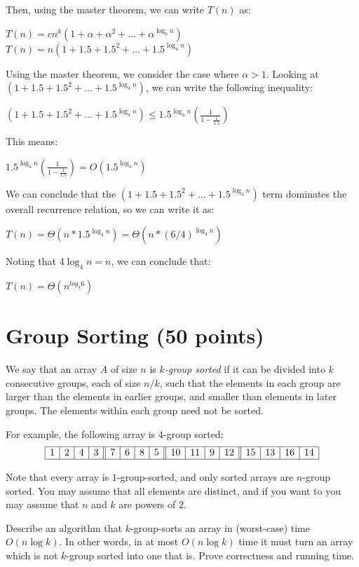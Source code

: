 \documentclass[11pt]{article}
\begin{document}
\begin{enumerate}
Then, using the master theorem, we can write $T(n)$ as:

$T(n) = cn^k (1 + \alpha + \alpha^2 + ... + \alpha^{\log_{b}{n}})$
$T(n) = n (1 + 1.5 + 1.5^2 + ... + 1.5^{\log_{4}{n}})$

Using the master theorem, we consider the case where $\alpha > 1$. 
Looking at $(1 + 1.5 + 1.5^2 + ... + 1.5^{\log_{4}{n}})$, we can write the following inequality: 

$(1 + 1.5 + 1.5^2 + ... + 1.5^{\log_{4}{n}}) \leq 1.5^{\log_{4}{n}} (\frac{1}{1-\frac{1}{1.5}})$

This means:

$1.5^{\log_{4}{n}} (\frac{1}{1-\frac{1}{1.5}}) = O(1.5^{\log_{4}{n}})$

We can conclude that the $(1 + 1.5 + 1.5^2 + ... + 1.5^{\log_{4}{n}})$ term dominates the overall recurrence relation, 
so we can write it as:

$T(n) = \Theta(n*1.5^{\log_{4}{n}}) = \Theta(n*(6/4)^{\log_{4}{n}})$

Noting that $4 \log_{4}{n} = n$, we can conclude that:

$T(n) = \Theta(n^{log_{4}{6}})$

\end{enumerate}


\section{Group Sorting (50 points)}
We say that an array $A$ of size $n$ is \emph{$k$-group sorted} if it can be divided into $k$ consecutive groups, each of size $n/k$, such that the elements in each group are larger than the elements in earlier groups, and smaller than elements in later groups. The elements within each group need not be sorted.   

For example, the following array is $4$-group sorted:
\[
\begin{array}{|c|c|c|c||c|c|c|c||c|c|c|c||c|c|c|c|}
\hline
1 &2 &4 &3 &7 &6 &8 &5 &10 &11 &9 &12 &15 &13 &16 &14\\
\hline
\end{array}
\]

Note that every array is $1$-group-sorted, and only sorted arrays are $n$-group sorted.  You may assume that all elements are distinct, and if you want to you may assume that $n$ and $k$ are powers of $2$. 

Describe an algorithm that $k$-group-sorts an array in (worst-case) time $O(n \log k)$.  In other words, in at most $O(n \log k)$ time it must turn an array which is not $k$-group sorted into one that is.  Prove correctness and running time.
\end{document}
